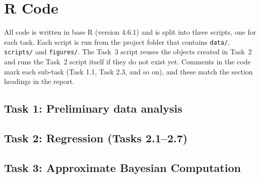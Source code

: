 \section{R Code}
\label{app:code}

All code is written in base R (version 4.6.1) and is split into three scripts, one for each task. Each script is run from the project folder that contains \texttt{data/}, \texttt{scripts/} and \texttt{figures/}. The Task~3 script reuses the objects created in Task~2 and runs the Task~2 script itself if they do not exist yet. Comments in the code mark each sub-task (Task 1.1, Task 2.3, and so on), and these match the section headings in the report.

\subsection{Task 1: Preliminary data analysis}
\label{app:task1}


\subsection{Task 2: Regression (Tasks 2.1--2.7)}
\label{app:task2}


\subsection{Task 3: Approximate Bayesian Computation}
\label{app:task3}

